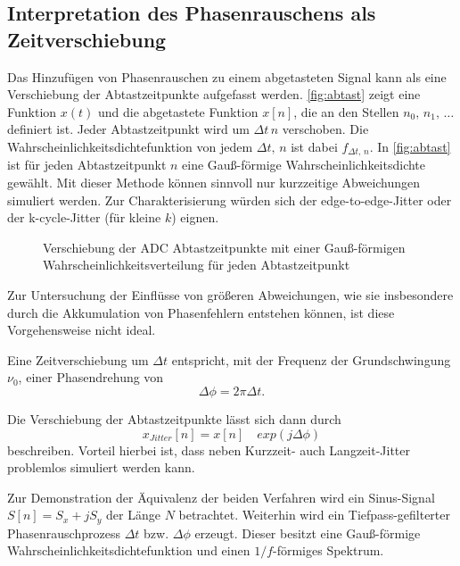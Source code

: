 \subsection{Interpretation des Phasenrauschens als Zeitverschiebung}
Das Hinzufügen von Phasenrauschen zu einem abgetasteten Signal kann als eine Verschiebung der Abtastzeitpunkte aufgefasst werden. \autoref{fig:abtast} zeigt eine Funktion $x(t)$ und die abgetastete Funktion $x[n]$, die an den Stellen $n_0,\,n_1,\,\dots$ definiert ist. Jeder Abtastzeitpunkt wird um $\Delta t\,n$ verschoben. Die Wahrscheinlichkeitsdichtefunktion von jedem $\Delta t,\,n$ ist dabei $f_{\Delta t,\,n}$. In \autoref{fig:abtast} ist für jeden Abtastzeitpunkt $n$ eine Gauß-förmige Wahrscheinlichkeitsdichte gewählt. Mit dieser Methode können sinnvoll nur kurzzeitige Abweichungen simuliert werden. Zur Charakterisierung würden sich der edge-to-edge-Jitter oder der k-cycle-Jitter (für kleine $k$) eignen.

\begin{figure}[H]
	\centering
	\caption[Verschiebung der ADC Abtastzeitpunkte]{Verschiebung der ADC Abtastzeitpunkte mit einer Gauß-förmigen Wahrscheinlichkeitsverteilung für jeden Abtastzeitpunkt}
	\label{fig:abtast}
\end{figure}

Zur Untersuchung der Einflüsse von größeren Abweichungen, wie sie insbesondere durch die Akkumulation von Phasenfehlern entstehen können, ist diese Vorgehensweise nicht ideal.

Eine Zeitverschiebung um $\Delta t$ entspricht, mit der Frequenz der Grundschwingung $\nu_0$, einer Phasendrehung von
\begin{equation}
\Delta \phi = 2 \pi \Delta t.
\end{equation}

Die Verschiebung der Abtastzeitpunkte lässt sich dann durch
\begin{equation}
x_{Jitter}[n] = x[n] \quad exp(j \Delta \phi)
\end{equation}
beschreiben. Vorteil hierbei ist, dass neben Kurzzeit- auch Langzeit-Jitter problemlos simuliert werden kann.

Zur Demonstration der Äquivalenz der beiden Verfahren wird ein Sinus-Signal $S[n]=S_x+j S_y$ der Länge $N$ betrachtet. Weiterhin wird ein Tiefpass-gefilterter Phasenrauschprozess $\Delta t$ bzw. $\Delta \phi$ erzeugt. Dieser besitzt eine Gauß-förmige Wahrscheinlichkeitsdichtefunktion und einen $1/f$-förmiges Spektrum.

